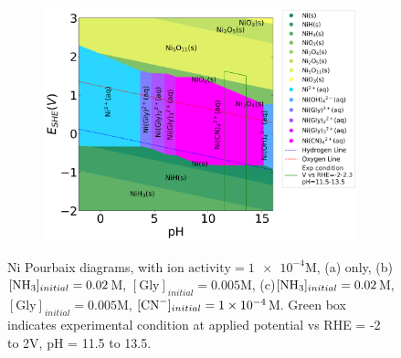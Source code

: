 \documentclass[journal=jacsat,manuscript=article]{achemso}
\begin{document}
\begin{figure}[htbp]
\begin{subfigure}[b]{0.3\textwidth}
        \par\medskip
    \end{subfigure}
    \begin{subfigure}[b]{0.3\textwidth}
        \subcaption{}\label{fig:Ni_Pourbaix_NH3_Gly_CN}
        \includegraphics[width=\textwidth]{Figures/pourbaix_diagrams/Ni-NH3-H2O_activity=1e-04_[NH3]=0.02M_[Gly]=0.005M_[CN]=0.0001.png}
        \par\medskip   
    \end{subfigure}
    \caption{Ni Pourbaix diagrams, with $\text{ion activity}=\num{1e-4}$M, (a) only, (b)$[\ce{NH3}]_{initial}= 0.02$M, $[\text{Gly}]_{initial}=0.005$M, (c)$[\ce{NH3}]_{initial}= 0.02$M, $[\text{Gly}]_{initial}=0.005$M,  $[\ce{CN-}]_{initial}=\num{1e-4}$M. Green box indicates experimental condition at applied potential vs RHE = -2 to 2V, pH = 11.5 to 13.5.}
    \label{fig:Ni_Pourbaix}
\end{figure}
\end{document}
